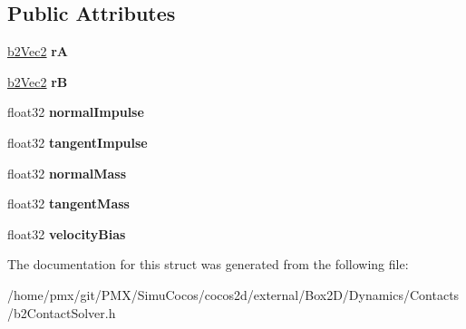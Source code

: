 \subsection*{Public Attributes}
\begin{DoxyCompactItemize}
\item 
\mbox{\label{structb2VelocityConstraintPoint_a0be704259cd5d3902d8581e186546e5e}} 
\hyperlink{structb2Vec2}{b2\+Vec2} {\bfseries rA}
\item 
\mbox{\label{structb2VelocityConstraintPoint_ab5d1c98e09e2f859b71f6d0fda46c0d5}} 
\hyperlink{structb2Vec2}{b2\+Vec2} {\bfseries rB}
\item 
\mbox{\label{structb2VelocityConstraintPoint_a304653be2ca1c1daa72d7b7868b37b11}} 
float32 {\bfseries normal\+Impulse}
\item 
\mbox{\label{structb2VelocityConstraintPoint_ac3e3be335d204bb6a89a7303831cc89b}} 
float32 {\bfseries tangent\+Impulse}
\item 
\mbox{\label{structb2VelocityConstraintPoint_a5997e9781cedbd86333a84a967b59c33}} 
float32 {\bfseries normal\+Mass}
\item 
\mbox{\label{structb2VelocityConstraintPoint_a029692226a637f5e687022041b25043c}} 
float32 {\bfseries tangent\+Mass}
\item 
\mbox{\label{structb2VelocityConstraintPoint_a81d492345d9b1c8f51ec10154ab840f2}} 
float32 {\bfseries velocity\+Bias}
\end{DoxyCompactItemize}


The documentation for this struct was generated from the following file\+:\begin{DoxyCompactItemize}
\item 
/home/pmx/git/\+P\+M\+X/\+Simu\+Cocos/cocos2d/external/\+Box2\+D/\+Dynamics/\+Contacts/b2\+Contact\+Solver.\+h\end{DoxyCompactItemize}
